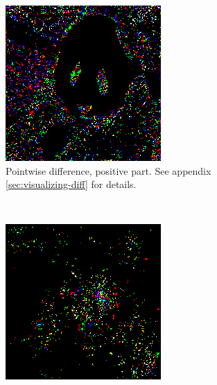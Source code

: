 \documentclass[11pt, a4paper]{article}
\begin{document}
\begin{figure}[h!tb]
    \centering
    \begin{subfigure}[t]{0.45\textwidth}
        \includegraphics[width=\textwidth]{aes/panda_acorn_10_0dot9_posdiff.png}
        \caption{Pointwise difference, positive part. See appendix \ref{sec:visualizing-diff} for details.}
        \label{fig:ae-difference-diff}
    \end{subfigure}
    ~ %
    \begin{subfigure}[t]{0.45\textwidth}
        \includegraphics[width=\textwidth]{aes/panda_acorn_10_0dot9_grad.png}

\end{subfigure}
\end{figure}
\end{document}
